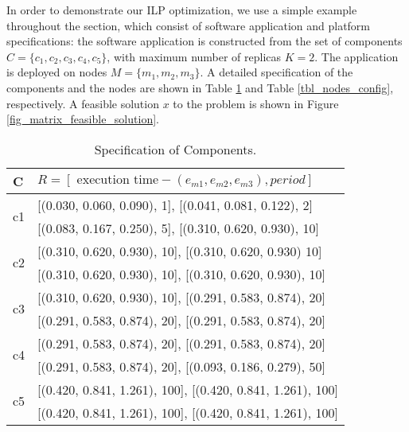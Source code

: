 In order to demonstrate our ILP optimization, we use a  simple example throughout the section, which consist of software application and platform specifications: the software application is constructed from the set of components $C=\{c_1, c_2, c_3, c_4, c_5\}$, with maximum number of replicas $K=2$. The application is deployed on nodes $M=\{m_1,m_2,m_3\}$. A detailed specification of the components and the nodes are shown in Table \ref{tbl_comps_config} and Table \ref{tbl_nodes_config}, respectively. A feasible solution $x$ to the problem is shown in Figure \ref{fig_matrix_feasible_solution}.
\begin{table}[h]
\centering
\begin{tabular}{@{}p{0.25cm}l@{}}
\toprule
C  & $R=[\text{ execution time}-(e_{m1}, e_{m2}, e_{m3}), period]$ \\ \midrule
\multirow{2}{4em}{c1} 
& [(0.030, 0.060, 0.090), 1], [(0.041, 0.081, 0.122), 2]\\
&[(0.083, 0.167, 0.250), 5], [(0.310, 0.620, 0.930), 10] \\[0.3em]
\multirow{2}{4em}{c2} 
& [(0.310, 0.620, 0.930), 10], [(0.310, 0.620, 0.930) 10]\\
&[(0.310, 0.620, 0.930), 10], [(0.310, 0.620, 0.930), 10]  \\[0.3em]
\multirow{2}{4em}{c3} 
& [(0.310, 0.620, 0.930), 10], [(0.291, 0.583, 0.874), 20]\\
& [(0.291, 0.583, 0.874), 20], [(0.291, 0.583, 0.874), 20]\\[0.3em]
\multirow{2}{4em}{c4} 
& [(0.291, 0.583, 0.874), 20], [(0.291, 0.583, 0.874), 20]\\
& [(0.291, 0.583, 0.874), 20], [(0.093, 0.186, 0.279), 50]\\[0.3em]
\multirow{2}{4em}{c5}  
& [(0.420, 0.841, 1.261), 100], [(0.420, 0.841, 1.261), 100]\\
& [(0.420, 0.841, 1.261), 100], [(0.420, 0.841, 1.261), 100]\\[0.3em]
\bottomrule
\end{tabular}
\caption{Specification of Components.}
\label{tbl_comps_config}
\end{table}

